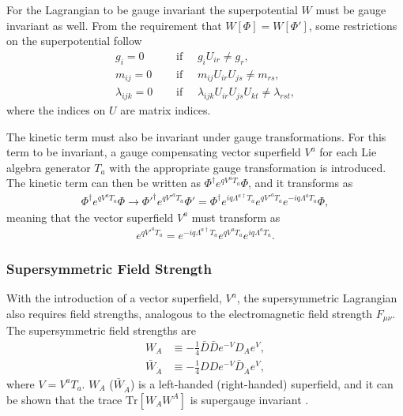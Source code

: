 \documentclass[twoside,english]{uiofysmaster}
\begin{document}
For the Lagrangian to be gauge invariant the superpotential $W$ must be gauge invariant as well. From the requirement that $W[\Phi] = W[\Phi']$, some restrictions on the superpotential follow
\begin{align}
g_i = 0 \quad &\text{ if } \quad g_i U_{ir} \neq g_r,\\
m_{ij} = 0 \quad &\text{ if } \quad m_{ij} U_{ir} U_{js} \neq m_{rs},\\
\lambda_{ijk} = 0 \quad &\text{ if } \quad \lambda_{ijk}U_{ir}U_{js}U_{kt} \neq \lambda_{rst},
\end{align} 
where the indices on $U$ are matrix indices. 

The kinetic term must also be invariant under gauge transformations. For this term to be invariant, a gauge compensating vector superfield $V^a$ for each Lie algebra generator $T_a$ with the appropriate gauge transformation is introduced. The kinetic term can then be written as $\Phi^{\dagger} e^{qV^aT_a} \Phi$, and it transforms as
\begin{align}
\Phi^{\dagger} e^{qV^aT_a} \Phi \rightarrow {\Phi'}^{\dagger} e^{q{V'}^aT_a} \Phi' = \Phi^{\dagger} e^{iq\Lambda^{a \dagger} T_a} e^{q{V'}^aT_a} e^{-iq \Lambda^a T_a} \Phi,
\end{align}
meaning that the vector superfield $V^a$ must transform as
\begin{align}
e^{q{V'}^a T_a} = e^{-iq \Lambda^{a \dagger} T_a} e^{qV^aT_a} e^{iq\Lambda^a T_a}.
\end{align}

\subsubsection{Supersymmetric Field Strength}

With the introduction of a vector superfield, $V^a$, the supersymmetric Lagrangian also requires field strengths, analogous to the electromagnetic field strength $F_{\mu \nu}$. The supersymmetric field strengths are 
\begin{align}
W_A & \equiv - \frac{1}{4} \bar{D} \bar{D} e^{-V} D_A e^V,\\
\bar{W}_{\dot{A}} & \equiv - \frac{1}{4} DDe^{-V}\bar{D}_{\dot{A}} e^V,
\end{align}
where $V = V^a T_a$. $W_A$ ($\bar{W}_{\dot{A}}$) is a left-handed (right-handed) superfield, and it can be shown that the trace $\text{Tr}[W_AW^A]$ is supergauge invariant \cite{batzing2017lecture}. 
\end{document}

